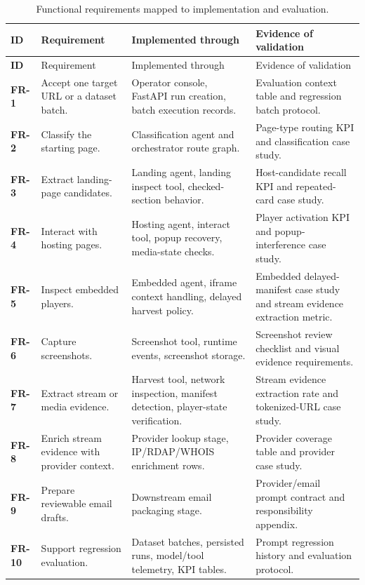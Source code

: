 \begin{longtable}{>{\raggedright\arraybackslash\bfseries}p{1.7cm}
                  >{\raggedright\arraybackslash}p{4.1cm}
                  >{\raggedright\arraybackslash}p{4.0cm}
                  >{\raggedright\arraybackslash}p{4.2cm}}
\caption{Functional requirements mapped to implementation and evaluation.}
\label{tab:functional-traceability}\\
\toprule
\rowcolor{accent!8}
ID & Requirement & Implemented through & Evidence of validation \\
\midrule
\endfirsthead
\toprule
\rowcolor{accent!8}
ID & Requirement & Implemented through & Evidence of validation \\
\midrule
\endhead
\bottomrule
\endfoot
FR-1 & Accept one target URL or a dataset batch. & Operator console, FastAPI run
creation, batch execution records. & Evaluation context table and regression
batch protocol. \\
FR-2 & Classify the starting page. & Classification agent and orchestrator
route graph. & Page-type routing KPI and classification case study. \\
FR-3 & Extract landing-page candidates. & Landing agent, landing inspect tool,
checked-section behavior. & Host-candidate recall KPI and repeated-card case
study. \\
FR-4 & Interact with hosting pages. & Hosting agent, interact tool, popup
recovery, media-state checks. & Player activation KPI and popup-interference
case study. \\
FR-5 & Inspect embedded players. & Embedded agent, iframe context handling,
delayed harvest policy. & Embedded delayed-manifest case study and stream
evidence extraction metric. \\
FR-6 & Capture screenshots. & Screenshot tool, runtime events, screenshot
storage. & Screenshot review checklist and visual evidence requirements. \\
FR-7 & Extract stream or media evidence. & Harvest tool, network inspection,
manifest detection, player-state verification. & Stream evidence extraction
rate and tokenized-URL case study. \\
FR-8 & Enrich stream evidence with provider context. & Provider lookup stage,
IP/RDAP/WHOIS enrichment rows. & Provider coverage table and provider case
study. \\
FR-9 & Prepare reviewable email drafts. & Downstream email packaging stage. &
Provider/email prompt contract and responsibility appendix. \\
FR-10 & Support regression evaluation. & Dataset batches, persisted runs,
model/tool telemetry, KPI tables. & Prompt regression history and evaluation
protocol. \\
\end{longtable}

